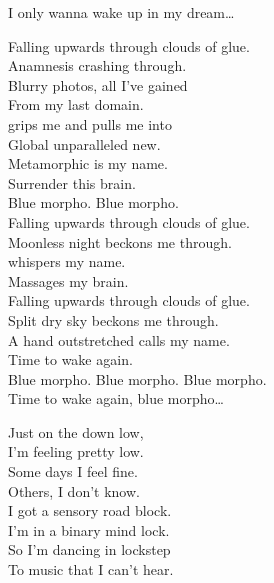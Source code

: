 I only wanna wake up in my dream… \\





Falling upwards through clouds of glue. \\
Anamnesis crashing through. \\
Blurry photos, all I've gained \\
From my last domain. \\

 grips me and pulls me into \\
Global unparalleled new. \\
Metamorphic is my name. \\
Surrender this brain. \\

Blue morpho. Blue morpho. \\

Falling upwards through clouds of glue. \\
Moonless night beckons me through. \\
 whispers my name. \\
Massages my brain. \\

Falling upwards through clouds of glue. \\
Split dry sky beckons me through. \\
A hand outstretched calls my name. \\
Time to wake again. \\

Blue morpho. Blue morpho. Blue morpho. \\

Time to wake again, blue morpho… \\





Just on the down low, \\
I'm feeling pretty low. \\
Some days I feel fine. \\
Others, I don't know. \\
I got a sensory road block. \\
I'm in a binary mind lock. \\
So I'm dancing in lockstep \\
To music that I can't hear. \\

